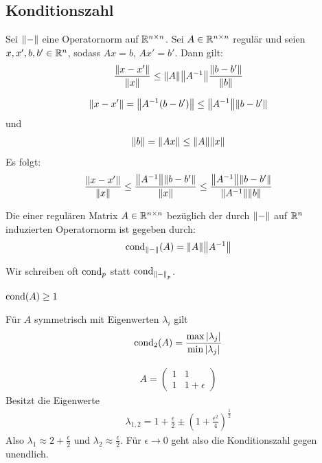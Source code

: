 \documentclass{report}
\begin{document}
\subsection{Konditionszahl}
\begin{theorem}
	Sei $\norm{-}$ eine Operatornorm auf $\mathbb{R}^{n \times n}$. Sei $A \in \mathbb{R}^{n \times n}$ regulär und seien $x, x', b, b' \in \mathbb{R}^n$, sodass $Ax = b$, $Ax' = b'$. Dann gilt:
	\begin{align*}
		\frac{\norm{x - x'}}{\norm{x}} \leq \norm{A}\norm{A^{-1}}\frac{\norm{b - b'}}{\norm{b}}
	\end{align*}
\end{theorem}
\begin{theorem}
	\begin{align*}
		\norm{x - x'} = \norm{A^{-1}(b - b')} \leq \norm{A^{-1}}\norm{b - b'}
	\end{align*}
	und
	\begin{align*}
		\norm{b} = \norm{Ax} \leq \norm{A}\norm{x}
	\end{align*}
	Es folgt:
	\begin{align*}
		\frac{\norm{x - x'}}{\norm{x}} \leq \frac{\norm{A^{-1}}\norm{b - b'}}{\norm{x}} \leq \frac{\norm{A^{-1}}\norm{b - b'}}{\norm{A^{-1}}\norm{b}}
	\end{align*}
\end{theorem}
\begin{definition}
	Die  einer regulären Matrix $A \in \mathbb{R}^{n \times n}$ bezüglich der durch $\norm{-}$ auf $\mathbb{R}^n$ induzierten Operatornorm ist gegeben durch:
	\begin{align*}
		\textnormal{cond}_{\norm{-}}(A) = \norm{A}\norm{A^{-1}}
	\end{align*}
\end{definition}
Wir schreiben oft $\textnormal{cond}_p$ statt $\textnormal{cond}_{\norm{-}_p}$.
\begin{lemma}
	$\textnormal{cond}(A) \geq 1$
\end{lemma}
\begin{lemma}
	Für $A$ symmetrisch mit Eigenwerten $\lambda_i$ gilt 
	\begin{align*}
		\textnormal{cond}_2(A) = \frac{\max \abs{\lambda_j}}{\min \abs{\lambda_j}}
	\end{align*}
\end{lemma}
\begin{example}
	\begin{align*}
		A = \begin{pmatrix}
			1 & 1\\
			1 & 1 + \epsilon
		\end{pmatrix}
	\end{align*}
	Besitzt die Eigenwerte
	\begin{align*}
		\lambda_{1,2} = 1 + \frac{\epsilon}{2} \pm \left(1 + \frac{\epsilon^2}{4}\right)^\frac{1}{2}
	\end{align*}
	Also $\lambda_1 \approx 2 + \frac{\epsilon}{2}$ und $\lambda_2 \approx \frac{\epsilon}{2}$. Für $\epsilon \to 0$ geht also die Konditionszahl gegen unendlich.
\end{example}
\end{document}

